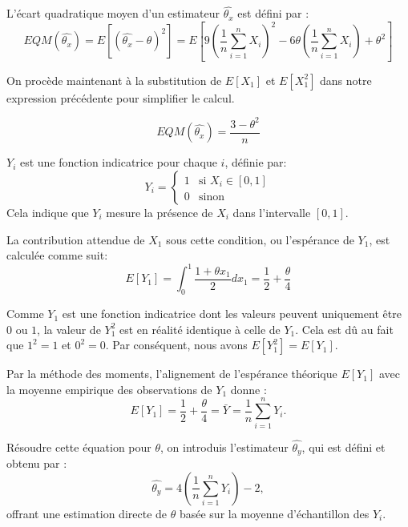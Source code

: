 \documentclass[../main.tex]{subfiles}
\begin{document}
\begin{CJK*}{UTF8}{gbsn}
L'écart quadratique moyen  d'un estimateur $\hat{\theta_x}$ est défini par :
\begin{equation*}
EQM(\hat{\theta_x}) = E[(\hat{\theta_x} - \theta)^2] = E\left[9\left(\frac{1}{n}\sum_{i=1}^{n} X_i\right)^2 - 6\theta\left(\frac{1}{n}\sum_{i=1}^{n} X_i\right) + \theta^2\right]
\end{equation*}

On procède maintenant à la substitution de $E[X_1]$ et $E[X_1^2]$ dans notre expression précédente pour simplifier le calcul.

\begin{equation*}
EQM(\hat{\theta_x}) = \frac{3 - \theta^2}{n}
\end{equation*}

$Y_i$ est une fonction indicatrice pour chaque $i$, définie par:
\begin{equation*}
Y_i = \begin{cases} 
1 & \text{si } X_i \in [0,1] \\
0 & \text{sinon} 
\end{cases}
\end{equation*}
Cela indique que $Y_i$ mesure la présence de $X_i$ dans l'intervalle $[0,1]$.

La contribution attendue de $X_1$ sous cette condition, ou l'espérance de $Y_1$, est calculée comme suit:
\begin{equation*}
E[Y_1] = \int_{0}^{1} \frac{1 + \theta x_1}{2} dx_1 = \frac{1}{2} + \frac{\theta}{4}
\end{equation*}

Comme $Y_1$ est une fonction indicatrice dont les valeurs peuvent uniquement être $0$ ou $1$, 
la valeur de $Y_1^2$ est en réalité identique à celle de $Y_1$. Cela est dû au fait que $1^2 = 1$ et $0^2 = 0$. Par conséquent, nous avons $E[Y_1^2] = E[Y_1]$.

Par la méthode des moments, l'alignement de l'espérance théorique $E[Y_1]$ avec la moyenne empirique des observations de $Y_1$ donne :
\begin{equation*}
E[Y_1] = \frac{1}{2} + \frac{\theta}{4} = \bar{Y} = \frac{1}{n}\sum_{i=1}^{n} Y_i.
\end{equation*}

Résoudre cette équation pour $\theta$, on introduis l'estimateur $\hat{\theta_y}$, qui est défini et obtenu par :
\begin{equation*}
\hat{\theta_y} = 4\left(\frac{1}{n}\sum_{i=1}^{n} Y_i\right) - 2,
\end{equation*}
offrant une estimation directe de $\theta$ basée sur la moyenne d'échantillon des $Y_i$.


\end{CJK*}
\end{document}
